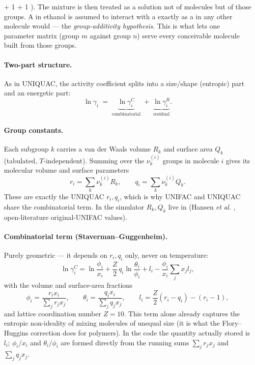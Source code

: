 \documentclass[11pt,a4paper]{article}
\begin{document}
 $+$ 1  $+$ 1 ). The mixture is then treated
as a solution not of molecules but of those groups. A  in
ethanol is assumed to interact with a  exactly as a 
in any other molecule would --- the \emph{group-additivity hypothesis}.
This is what lets one parameter matrix (group $m$ against group $n$)
serve every conceivable molecule built from those groups.

\paragraph{Two-part structure.} As in UNIQUAC, the activity coefficient
splits into a size/shape (entropic) part and an energetic part:
\begin{equation}
   \ln \gamma_i \;=\; \underbrace{\ln \gamma_i^{C}}_{\text{combinatorial}}
                \;+\; \underbrace{\ln \gamma_i^{R}}_{\text{residual}}.
   \label{eq:unifac-split}
\end{equation}

\paragraph{Group constants.} Each subgroup $k$ carries a van der Waals
volume $R_k$ and surface area $Q_k$ (tabulated, $T$-independent). Summing
over the $\nu^{(i)}_k$ groups in molecule $i$ gives its molecular volume
and surface parameters
\begin{equation}
   r_i = \sum_k \nu^{(i)}_k R_k,
   \qquad
   q_i = \sum_k \nu^{(i)}_k Q_k.
   \label{eq:unifac-rq}
\end{equation}
These are exactly the UNIQUAC $r_i, q_i$, which is why UNIFAC and
UNIQUAC share the combinatorial term. In the simulator $R_k, Q_k$ live
in  (Hansen \emph{et al.}
\cite{Hansen1991}, open-literature original-UNIFAC values).

\paragraph{Combinatorial term (Staverman--Guggenheim).} Purely
geometric --- it depends on $r_i, q_i$ only, never on temperature:
\begin{equation}
   \ln \gamma_i^{C}
   = \ln\frac{\phi_i}{x_i}
    + \frac{Z}{2}\,q_i \ln\frac{\theta_i}{\phi_i}
    + l_i - \frac{\phi_i}{x_i}\sum_j x_j l_j,
   \label{eq:unifac-comb}
\end{equation}
with the volume and surface-area fractions
\begin{equation}
   \phi_i = \frac{r_i x_i}{\sum_j r_j x_j},\qquad
   \theta_i = \frac{q_i x_i}{\sum_j q_j x_j},\qquad
   l_i = \frac{Z}{2}(r_i - q_i) - (r_i - 1),
\end{equation}
and lattice coordination number $Z = 10$. This term alone already
captures the entropic non-ideality of mixing molecules of unequal size
(it is what the Flory--Huggins correction does for polymers). In the code
the quantity actually stored is $l_i$; $\phi_i/x_i$ and $\theta_i/\phi_i$
are formed directly from the running sums $\sum_j r_j x_j$ and
$\sum_j q_j x_j$.
\end{document}
